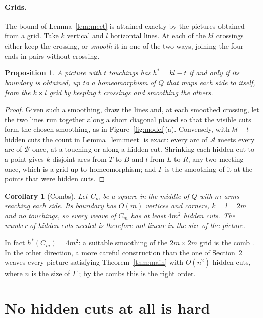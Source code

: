 \documentclass[11pt,a4paper]{article}
\newtheorem{proposition}[theorem]{Proposition}
\newtheorem{corollary}[theorem]{Corollary}
\theoremstyle{definition}
\theoremstyle{remark}
\newcommand{\A}{\mathcal{A}}
\newcommand{\B}{\mathcal{B}}
\begin{document}
\paragraph{Grids.}
The bound of Lemma~\ref{lem:meet} is attained exactly by the pictures
obtained from a grid. Take $k$ vertical and $l$ horizontal lines. At each
of the $kl$ crossings either keep the crossing, or \emph{smooth} it in one
of the two ways, joining the four ends in pairs without crossing.

\begin{proposition}\label{prop:grid}
A picture with $t$ touchings has $h^*=kl-t$ if and only if its boundary is
obtained, up to a homeomorphism of $Q$ that maps each side to itself, from
the $k\times l$ grid by keeping $t$ crossings and smoothing the others.
\end{proposition}
\begin{proof}
Given such a smoothing, draw the lines and, at each smoothed crossing, let
the two lines run together along a short diagonal placed so that the
visible cuts form the chosen smoothing, as in Figure~\ref{fig:model}(a).
Conversely, with $kl-t$ hidden cuts the count in Lemma~\ref{lem:meet} is
exact: every arc of $\A$ meets every arc of $\B$ once, at a touching or
along a hidden cut. Shrinking each hidden cut to a point gives $k$ disjoint
arcs from $T$ to $B$ and $l$ from $L$ to $R$, any two meeting once, which
is a grid up to homeomorphism; and $\Gamma$ is the smoothing of it at the
points that were hidden cuts.
\end{proof}

\begin{corollary}[Combs]\label{cor:comb}
Let $C_m$ be a square in the middle of $Q$ with $m$ arms reaching each
side. Its boundary has $O(m)$ vertices and corners, $k=l=2m$ and no
touchings, so every weave of $C_m$ has at least $4m^2$ hidden cuts. The
number of hidden cuts needed is therefore not linear in the size of the
picture.
\end{corollary}

In fact $h^*(C_m)=4m^2$: a suitable smoothing of the $2m\times2m$ grid is
the comb \cite{note}. In the other direction, a more careful construction
than the one of Section~2 weaves every picture satisfying
Theorem~\ref{thm:main} with $O(n^2)$ hidden cuts, where $n$ is the size of
$\Gamma$ \cite{note}; by the combs this is the right order.

\section{No hidden cuts at all is hard}
\end{document}
